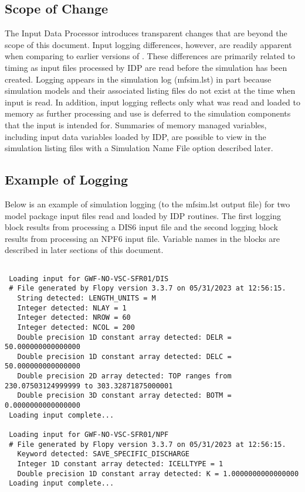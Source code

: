 \subsection{Scope of Change}

The Input Data Processor introduces transparent changes that are beyond the scope of this document.  Input logging differences, however, are readily apparent when comparing to earlier versions of \mf.  These differences are primarily related to timing as input files processed by IDP are read before the simulation has been created.  Logging appears in the simulation log (mfsim.lst) in part because simulation models and their associated listing files do not exist at the time when input is read.  In addition, input logging reflects only what was read and loaded to memory as further processing and use is deferred to the simulation components that the input is intended for.  Summaries of memory managed variables, including input data variables loaded by IDP, are possible to view in the simulation listing files with a Simulation Name File option described later. 

\subsection{Example of Logging}

Below is an example of simulation logging (to the mfsim.lst output file) for two model package input files read and loaded by IDP routines.  The first logging block results from processing a DIS6 input file and the second logging block results from processing an NPF6 input file.  Variable names in the blocks are described in later sections of this document.

\small
\begin{lstlisting}[style=modeloutput]

 Loading input for GWF-NO-VSC-SFR01/DIS
 # File generated by Flopy version 3.3.7 on 05/31/2023 at 12:56:15.
   String detected: LENGTH_UNITS = M
   Integer detected: NLAY = 1
   Integer detected: NROW = 60
   Integer detected: NCOL = 200
   Double precision 1D constant array detected: DELR = 50.000000000000000
   Double precision 1D constant array detected: DELC = 50.000000000000000
   Double precision 2D array detected: TOP ranges from 230.07503124999999 to 303.32871875000001
   Double precision 3D constant array detected: BOTM = 0.0000000000000000
 Loading input complete...

 Loading input for GWF-NO-VSC-SFR01/NPF
 # File generated by Flopy version 3.3.7 on 05/31/2023 at 12:56:15.
   Keyword detected: SAVE_SPECIFIC_DISCHARGE
   Integer 1D constant array detected: ICELLTYPE = 1
   Double precision 1D constant array detected: K = 1.0000000000000000
 Loading input complete...
\end{lstlisting}
